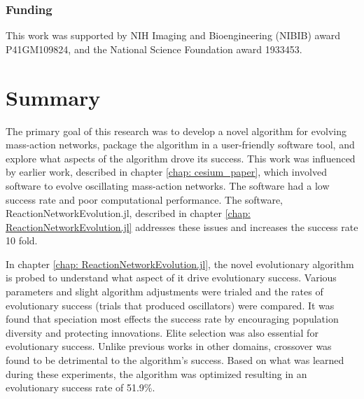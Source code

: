 \documentclass[12pt]{report}
\begin{document}
\subsection*{Funding}
This work was supported by NIH Imaging and Bioengineering (NIBIB) award P41GM109824, and the National Science Foundation award 1933453. 




\chapter{Summary}
The primary goal of this research was to develop a novel algorithm for evolving mass-action networks, package the algorithm in a user-friendly software tool, and explore what aspects of the algorithm drove its success. This work was influenced by earlier work, described in chapter \ref{chap: cesium_paper}, which involved software to evolve oscillating mass-action networks. The software had a low success rate and poor computational performance. The software, ReactionNetworkEvolution.jl, described in chapter \ref{chap: ReactionNetworkEvolution.jl} addresses these issues and increases the success rate 10 fold. 

In chapter \ref{chap: ReactionNetworkEvolution.jl}, the novel evolutionary algorithm is probed to understand what aspect of it drive evolutionary success. Various parameters and slight algorithm adjustments were trialed and the rates of evolutionary success (trials that produced oscillators) were compared. It was found that speciation most effects the success rate by encouraging population diversity and protecting innovations. Elite selection was also essential for evolutionary success. Unlike previous works in other domains, crossover was found to be detrimental to the algorithm's success. Based on what was learned during these experiments, the algorithm was optimized resulting in an evolutionary success rate of 51.9\%.
\end{document}
